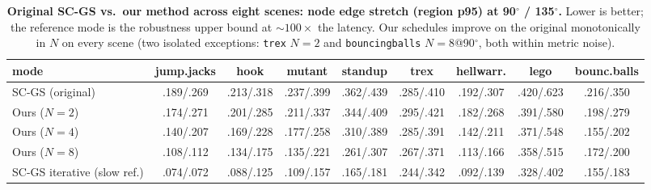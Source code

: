 \documentclass[10pt,twocolumn]{article}
\newcommand{\scgsOrig}{SC-GS (original)}
\newcommand{\ours}[1]{Ours ($N{=}#1$)}
\newcommand{\scgsIter}{SC-GS iterative}
\begin{document}
\begin{table}[t]
  \centering\small
  \caption{\textbf{Original SC-GS vs.\ our method across eight scenes: node
  edge stretch (region p95) at 90$^\circ$ / 135$^\circ$.} Lower is better; the
  reference mode is the robustness upper bound at ${\sim}100\times$ the
  latency. Our schedules improve on the original monotonically in $N$ on every
  scene (two isolated exceptions: \texttt{trex} $N{=}2$ and
  \texttt{bouncingballs} $N{=}8$@90$^\circ$, both within metric noise).}
  \label{tab:crossscene}
  \scriptsize
  \setlength{\tabcolsep}{2.6pt}
  \begin{tabular}{lcccccccc}
    \toprule
    mode & jump.jacks & hook & mutant & standup & trex & hellwarr. & lego & bounc.balls \\
    \midrule
    \scgsOrig{}          & .189/.269 & .213/.318 & .237/.399 & .362/.439 & .285/.410 & .192/.307 & .420/.623 & .216/.350 \\
    \ours{2}             & .174/.271 & .201/.285 & .211/.337 & .344/.409 & .295/.421 & .182/.268 & .391/.580 & .198/.279 \\
    \ours{4}             & .140/.207 & .169/.228 & .177/.258 & .310/.389 & .285/.391 & .142/.211 & .371/.548 & .155/.202 \\
    \ours{8}             & .108/.112 & .134/.175 & .135/.221 & .261/.307 & .267/.371 & .113/.166 & .358/.515 & .172/.200 \\
    \scgsIter{} (slow ref.) & .074/.072 & .088/.125 & .109/.157 & .165/.181 & .244/.342 & .092/.139 & .328/.402 & .155/.183 \\
    \bottomrule
  \end{tabular}
\end{table}
\end{document}
